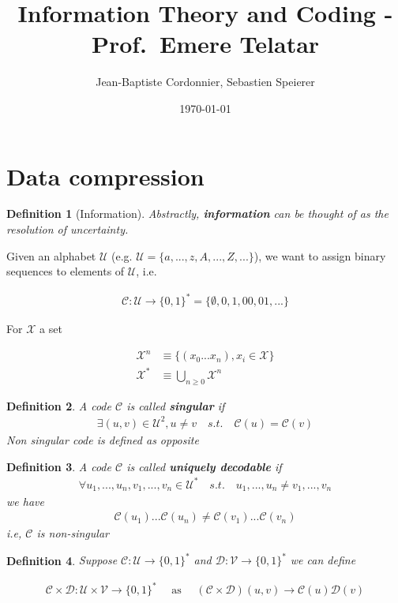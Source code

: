 \documentclass[twoside]{article}
\title{Information Theory and Coding - Prof.~Emere Telatar}
\date{\today}
\author{Jean-Baptiste Cordonnier, Sebastien Speierer}
\newtheorem{definition}{Definition}[section]
\theoremstyle{definition} %
\def\D{\mathcal{D}}
\def\V{\mathcal{V}}
\def\U{\mathcal{U}}
\def\X{\mathcal{X}}
\def\C{\mathcal{C}}
\begin{document}
\maketitle
\setcounter{tocdepth}{1}
\tableofcontents

\cleardoublepage

\section{Data compression}

\begin{definition}[Information]
  Abstractly, \textbf{information} can be thought of as the resolution of uncertainty.
\end{definition}

Given an alphabet $\U$ (e.g. $\U = \{a, ..., z, A, ..., Z, ...\}$), we want to assign binary sequences to elements of $\U$, i.e.

\begin{align*}
	\C: \U \rightarrow \{0, 1\}^* = \{\emptyset, 0, 1, 00, 01, ...\}
\end{align*}

For $\X$ a set

\begin{align*}
	\X^n &\equiv \{ (x_0 ... x_n), x_i \in \X\} \\
	\X^* &\equiv \bigcup_{n \geq 0} \X^n
\end{align*}

\begin{definition}
	A code $\C$ is called \textbf{singular} if
	\begin{align*}
		\exists (u, v) \in \U^2, u \neq v \quad s.t. \quad \C(u) = \C(v)
	\end{align*}
	Non singular code is defined as opposite
\end{definition}

\begin{definition}
	A code $\C$ is called \textbf{uniquely decodable} if
	\begin{align*}
		\forall u_1,...,u_n,v_1,...,v_n \in \U^* \quad s.t. \quad u_1,...,u_n \neq v_1,...,v_n
	\end{align*}
	we have
	\begin{align*}
		\C(u_1)...\C(u_n) \neq \C(v_1)...\C(v_n)
	\end{align*}
	i.e, $\C$ is non-singular
\end{definition}

\begin{definition}
	Suppose $\C : \U \rightarrow \{ 0, 1\}^*$ and $\D : \V \rightarrow \{ 0, 1\}^*$ we can define

	\begin{align*}
		\C \times \D : \U \times \V \rightarrow \{0, 1\}^*
		\quad \text{ as } \quad
		(\C \times \D)(u, v) \rightarrow \C(u)\D(v)
	\end{align*}
\end{definition}
\end{document}
